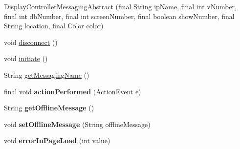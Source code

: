 \begin{DoxyCompactItemize}
\item 
\hyperlink{classgov_1_1fnal_1_1ppd_1_1dd_1_1display_1_1client_1_1DisplayControllerMessagingAbstract_a29d30efd5c44b5ac8ad2044fc8e9209e}{Display\-Controller\-Messaging\-Abstract} (final String ip\-Name, final int v\-Number, final int db\-Number, final int screen\-Number, final boolean show\-Number, final String location, final Color color)
\item 
void \hyperlink{classgov_1_1fnal_1_1ppd_1_1dd_1_1display_1_1client_1_1DisplayControllerMessagingAbstract_ab4669eeb7e29918c88f15ea2afc17604}{disconnect} ()
\item 
void \hyperlink{classgov_1_1fnal_1_1ppd_1_1dd_1_1display_1_1client_1_1DisplayControllerMessagingAbstract_ae25c8ff7cfa18c137ff9b0a04f65fd8c}{initiate} ()
\item 
String \hyperlink{classgov_1_1fnal_1_1ppd_1_1dd_1_1display_1_1client_1_1DisplayControllerMessagingAbstract_a7d2a03dd8cfa663368cbcf67fbcf804e}{get\-Messaging\-Name} ()
\item 
\hypertarget{classgov_1_1fnal_1_1ppd_1_1dd_1_1display_1_1client_1_1DisplayControllerMessagingAbstract_a669e9d8cd86408c7b578c7b5c39650b7}{final void {\bfseries action\-Performed} (Action\-Event e)}\label{classgov_1_1fnal_1_1ppd_1_1dd_1_1display_1_1client_1_1DisplayControllerMessagingAbstract_a669e9d8cd86408c7b578c7b5c39650b7}

\item 
\hypertarget{classgov_1_1fnal_1_1ppd_1_1dd_1_1display_1_1client_1_1DisplayControllerMessagingAbstract_a02fcbfd5923cccc17585007ceb7cc558}{String {\bfseries get\-Offline\-Message} ()}\label{classgov_1_1fnal_1_1ppd_1_1dd_1_1display_1_1client_1_1DisplayControllerMessagingAbstract_a02fcbfd5923cccc17585007ceb7cc558}

\item 
\hypertarget{classgov_1_1fnal_1_1ppd_1_1dd_1_1display_1_1client_1_1DisplayControllerMessagingAbstract_ac134aed7d435082990e7ede49f5a641c}{void {\bfseries set\-Offline\-Message} (String offline\-Message)}\label{classgov_1_1fnal_1_1ppd_1_1dd_1_1display_1_1client_1_1DisplayControllerMessagingAbstract_ac134aed7d435082990e7ede49f5a641c}

\item 
\hypertarget{classgov_1_1fnal_1_1ppd_1_1dd_1_1display_1_1client_1_1DisplayControllerMessagingAbstract_a3d9858154eb1bf65755cf3eab56539ad}{void {\bfseries error\-In\-Page\-Load} (int value)}\label{classgov_1_1fnal_1_1ppd_1_1dd_1_1display_1_1client_1_1DisplayControllerMessagingAbstract_a3d9858154eb1bf65755cf3eab56539ad}

\end{DoxyCompactItemize}
